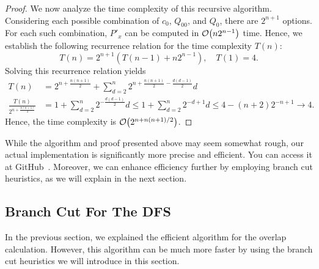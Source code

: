 \documentclass[a4paper, onecolumn, 11pt, longbibliography]{quantumarticle}
\begin{document}
\begin{proof}
  We now analyze the time complexity of this recursive algorithm.
  Considering each possible combination of
  $c_0$, $Q_{00}$, and $Q_0$,
  there are $2^{n+1}$ options.
  For each such combination,
  $P'_x$ can be computed in $\order{n2^{n-1}}$ time.
  Hence, we establish the following recurrence
  relation for the time complexity $T(n)$:
  \begin{equation*}
    T(n) = 2^{n+1} (T(n-1)+n2^{n-1}), \quad T(1) = 4.
  \end{equation*}
  Solving this recurrence relation yields
  \begin{align*}
    T(n)                                & = 2^{n+\frac{n(n+1)}{2}}+ \sum_{d=2}^{n} 2^{n+\frac{n(n+1)}{2}-\frac{d(d-1)}{2}}d \\
    \frac{T(n)}{2^{n+\frac{n(n+1)}{2}}} & = 1 + \sum_{d=2}^{n} 2^{-\frac{d(d-1)}{2}} d
    \leq 1 + \sum_{d=2}^{n} 2^{-d+1} d
    \leq 4-(n+2)2^{-n+1} \to 4.
  \end{align*}
  Hence, the time complexity is $\order{2^{n+n(n+1)/2}}$.
\end{proof}
While the algorithm and proof presented above may seem somewhat rough, our actual implementation is significantly more precise and efficient. You can access it at GitHub~\cite{Hamaguchi_stabilizer_extent_2024}.
Moreover, we can enhance efficiency further by employing branch cut heuristics, as we will explain in the next section.

\subsection{Branch Cut For The DFS}
\label{sec:branchCut}

In the previous section, we explained the efficient algorithm for the overlap calculation.
However, this algorithm can be much more faster
by using the branch cut heuristics we will introduce in this section.
\end{document}
